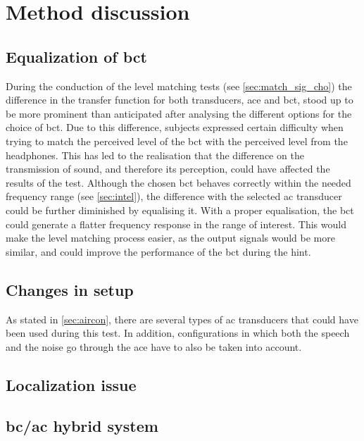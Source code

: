 \section{Method discussion}\label{sec:disc_meth}

\subsection*{Equalization of \gls{bct}}
During the conduction of the level matching tests (see \autoref{sec:match_sig_cho}) the difference in the transfer function for both transducers, \gls{ace} and \gls{bct}, stood up to be more prominent than anticipated after analysing the different options for the choice of \gls{bct}. Due to this difference, subjects expressed certain difficulty when trying to match the perceived level of the \gls{bct} with the perceived level from the headphones. This has led to the realisation that the difference on the transmission of sound, and therefore its perception, could have affected the results of the test.
Although the chosen \gls{bct} behaves correctly within the needed frequency range (see \autoref{sec:intel}), the difference with the selected \gls{ac} transducer could be further diminished by equalising it. With a proper equalisation, the \gls{bct} could generate a flatter frequency response in the range of interest. This would make the level matching process easier, as the output signals would be more similar, and could improve the performance of the \gls{bct} during the \gls{hint}.

\subsection*{Changes in setup}
As stated in \autoref{sec:aircon}, there are several types of \gls{ac} transducers that could have been used during this test. In addition, configurations in which both the speech and the noise go through the \gls{ace} have to also be taken into account.

\subsection*{Localization issue}

\subsection*{\gls{bc}/\gls{ac} hybrid system}


